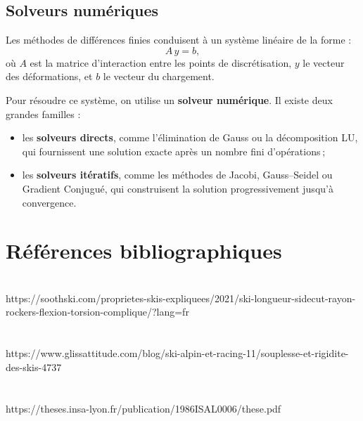 \documentclass[12pt, a4paper]{article}
\begin{document}
\subsection{Solveurs numériques}

Les méthodes de différences finies conduisent à un système linéaire de la forme :
\[
A \, y = b,
\]
où $A$ est la matrice d'interaction entre les points de discrétisation, $y$ le vecteur des déformations, et $b$ le vecteur du chargement.

Pour résoudre ce système, on utilise un \textbf{solveur numérique}. Il existe deux grandes familles :
\begin{itemize}
\item les \textbf{solveurs directs}, comme l’élimination de Gauss ou la décomposition LU, qui fournissent une solution exacte après un nombre fini d’opérations ;
  \item les \textbf{solveurs itératifs}, comme les méthodes de Jacobi, Gauss–Seidel ou Gradient Conjugué, qui construisent la solution progressivement jusqu’à convergence.
\end{itemize}

\section{\textbf{Références bibliographiques}}
\noindent
\\
https://soothski.com/proprietes-skis-expliquees/2021/ski-longueur-sidecut-rayon-rockers-flexion-torsion-complique/?lang=fr \\\\\\
https://www.glissattitude.com/blog/ski-alpin-et-racing-11/souplesse-et-rigidite-des-skis-4737 \\\\\\
https://theses.insa-lyon.fr/publication/1986ISAL0006/these.pdf
\end{document}
